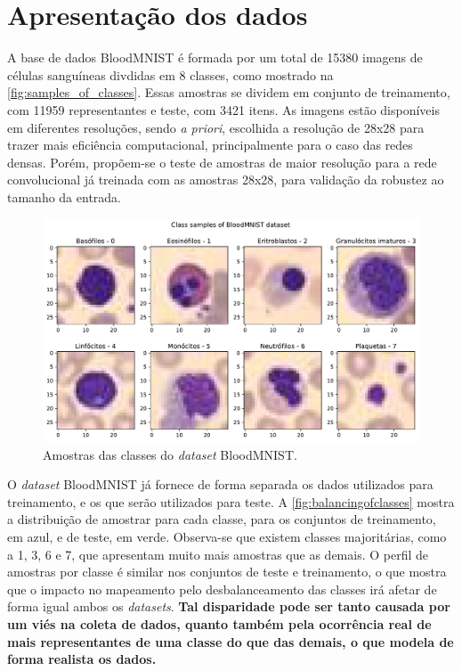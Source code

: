 
\section{Apresentação dos dados}

A base de dados BloodMNIST é formada por um total de 15380 imagens de células sanguíneas divdidas em 8 classes, como mostrado na \autoref{fig:samples_of_classes}. Essas amostras se dividem em conjunto de treinamento, com 11959 representantes e teste, com 3421 itens. As imagens estão disponíveis em diferentes resoluções, sendo \textit{a priori}, escolhida a resolução de 28x28 para trazer mais eficiência computacional, principalmente para o caso das redes densas. Porém, propõem-se o teste de amostras de maior resolução para a rede convolucional já treinada com as amostras 28x28, para validação da robustez ao tamanho da entrada.

\begin{figure}[H]
	\centering
	\includegraphics[width=0.75\linewidth]{../../plot/samples_of_classes}
	\caption{Amostras das classes do \textit{dataset} BloodMNIST.}
	\label{fig:samples_of_classes}
\end{figure}

O \textit{dataset} BloodMNIST já fornece de forma separada os dados utilizados para treinamento, e os que serão utilizados para teste. A \autoref{fig:balancingofclasses} mostra a distribuição de amostrar para cada classe, para os conjuntos de treinamento, em azul, e de teste, em verde. Observa-se que existem classes majoritárias, como a 1, 3, 6 e 7, que apresentam muito mais amostras que as demais. O perfil de amostras por classe é similar nos conjuntos de teste e treinamento, o que mostra que o impacto no mapeamento pelo desbalanceamento das classes irá afetar de forma igual ambos os \textit{datasets}. \textbf{Tal disparidade pode ser tanto causada por um viés na coleta de dados, quanto também pela ocorrência real de mais representantes de uma classe do que das demais, o que modela de forma realista os dados.}


